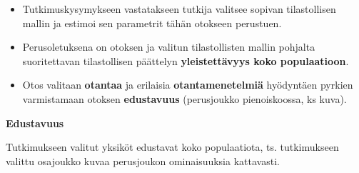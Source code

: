 \documentclass[
]{book}
\providecommand{\tightlist}{%
  \setlength{\itemsep}{0pt}\setlength{\parskip}{0pt}}
\begin{document}
\begin{itemize}
  \begin{itemize}
  \tightlist
  \item
    Tutkimuskysymykseen vastatakseen tutkija valitsee sopivan tilastollisen mallin ja estimoi sen parametrit tähän otokseen perustuen.
  \item
    Perusoletuksena on otoksen ja valitun tilastollisten mallin pohjalta suoritettavan tilastollisen päättelyn \textbf{yleistettävyys koko populaatioon}.
  \item
    Otos valitaan \textbf{otantaa} ja erilaisia \textbf{otantamenetelmiä} hyödyntäen pyrkien varmistamaan otoksen \textbf{edustavuus} (perusjoukko pienoiskoossa, ks kuva).
  \end{itemize}
\end{itemize}

\begin{noteblock}{}
\textbf{Edustavuus}

Tutkimukseen valitut yksiköt edustavat koko populaatiota, ts. tutkimukseen valittu osajoukko kuvaa perusjoukon ominaisuuksia kattavasti.

\end{noteblock}
\end{document}
